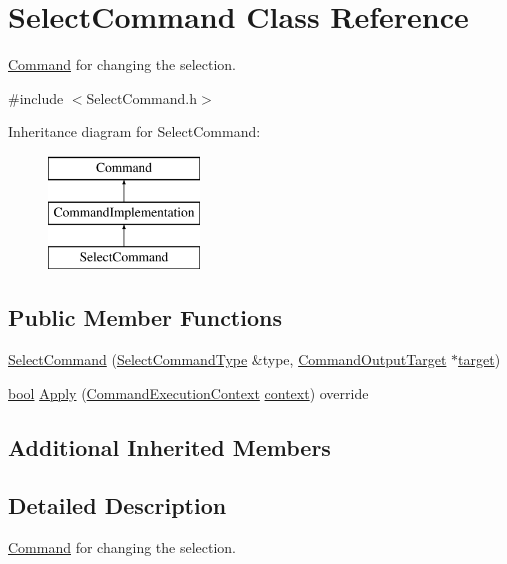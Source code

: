 \hypertarget{class_select_command}{}\section{Select\+Command Class Reference}
\label{class_select_command}


\hyperlink{class_command}{Command} for changing the selection.  




{\ttfamily \#include $<$Select\+Command.\+h$>$}

Inheritance diagram for Select\+Command\+:\begin{figure}[H]
\begin{center}
\leavevmode
\includegraphics[height=3.000000cm]{class_select_command}
\end{center}
\end{figure}
\subsection*{Public Member Functions}
\begin{DoxyCompactItemize}
\item 
\hyperlink{class_select_command_abc203ce6c42cfcc97e6bc94048adf1a6}{Select\+Command} (\hyperlink{class_select_command_type}{Select\+Command\+Type} \&type, \hyperlink{class_command_output_target}{Command\+Output\+Target} $\ast$\hyperlink{lib_2expat_8h_a15a257516a87decb971420e718853137}{target})
\item 
\hyperlink{mac_2config_2i386_2lib-src_2libsoxr_2soxr-config_8h_abb452686968e48b67397da5f97445f5b}{bool} \hyperlink{class_select_command_aeac32161ac9e6c100667fc00676cd036}{Apply} (\hyperlink{class_command_execution_context}{Command\+Execution\+Context} \hyperlink{structcontext}{context}) override
\end{DoxyCompactItemize}
\subsection*{Additional Inherited Members}


\subsection{Detailed Description}
\hyperlink{class_command}{Command} for changing the selection. 

